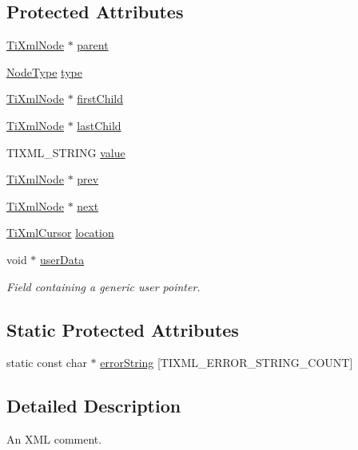 \subsection*{Protected Attributes}
\begin{DoxyCompactItemize}
\item 
\hyperlink{classTiXmlNode}{TiXmlNode} $\ast$ \hyperlink{classTiXmlNode_a662c4de61244e4fa5bd4e2d8c63143a5}{parent}
\item 
\hyperlink{classTiXmlNode_a836eded4920ab9e9ef28496f48cd95a2}{NodeType} \hyperlink{classTiXmlNode_a2619c6379181c16ba95ae6922e2ca839}{type}
\item 
\hyperlink{classTiXmlNode}{TiXmlNode} $\ast$ \hyperlink{classTiXmlNode_af749fb7f22010b80e8f904c32653d50e}{firstChild}
\item 
\hyperlink{classTiXmlNode}{TiXmlNode} $\ast$ \hyperlink{classTiXmlNode_a5b30756d21b304580d22a841ec9d61f8}{lastChild}
\item 
TIXML\_\-STRING \hyperlink{classTiXmlNode_aead528b3cedc33c16a6c539872c7cc8b}{value}
\item 
\hyperlink{classTiXmlNode}{TiXmlNode} $\ast$ \hyperlink{classTiXmlNode_a9c5370ea2cbfd9f0e0f7b30a57fd68f5}{prev}
\item 
\hyperlink{classTiXmlNode}{TiXmlNode} $\ast$ \hyperlink{classTiXmlNode_a2f329cc993d2d34df76e17dcbb776b45}{next}
\item 
\hyperlink{structTiXmlCursor}{TiXmlCursor} \hyperlink{classTiXmlBase_a0d992580f3bc264909f898e942677a3c}{location}
\item 
void $\ast$ \hyperlink{classTiXmlBase_ab242c01590191f644569fa89a080d97c}{userData}
\begin{DoxyCompactList}\small\item\em Field containing a generic user pointer. \item\end{DoxyCompactList}\end{DoxyCompactItemize}
\subsection*{Static Protected Attributes}
\begin{DoxyCompactItemize}
\item 
static const char $\ast$ \hyperlink{classTiXmlBase_a7ac8feec4100e446b3d78e1ac0659700}{errorString} \mbox{[}TIXML\_\-ERROR\_\-STRING\_\-COUNT\mbox{]}
\end{DoxyCompactItemize}


\subsection{Detailed Description}
An XML comment. 

